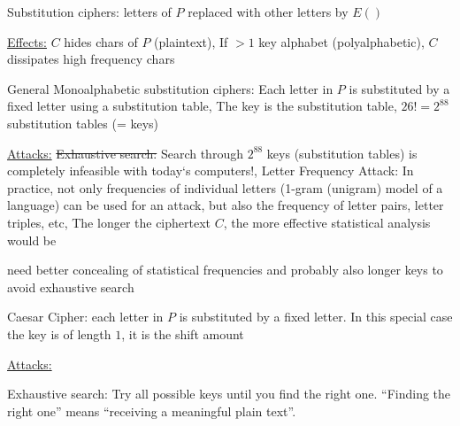 \documentclass[landscape, a4paper]{article}
\begin{document}
\begin{minipage}[t]{0.2\linewidth}
\begin{betterlist}
	\end{betterlist}
	\begin{betterlist}
		\item \alert{Substitution ciphers:} letters of $P$ replaced with other letters by $E()$
		\begin{betterlist}
			\item \underline{Effects:} $C$ hides chars of $P$ (plaintext), If $> 1$ key alphabet (polyalphabetic), $C$ dissipates high frequency chars
		\end{betterlist}
		\begin{betterlist}
			\item \alert{General Monoalphabetic substitution ciphers:} Each letter in $P$ is substituted by a fixed letter using a \alert{substitution table}, The \alert{key} is the substitution table, $26!=2^{88}$ substitution tables (= keys)
			\begin{betterlist}
				\item \underline{Attacks:} \sout{Exhaustive search:} Search through $2^{88}$ keys (substitution tables) is completely infeasible with today‘s computers!, \alert{Letter Frequency Attack:} In practice, not only frequencies of individual letters (\alert{1-gram} (unigram) model of a language) can be used for an attack, but also the frequency of letter pairs, letter triples, etc, The longer the ciphertext $C$, the more effective statistical analysis would be
				\item need better concealing of statistical frequencies and probably also longer keys to avoid exhaustive search
			\end{betterlist}
			\begin{betterlist}
				\item \alert{Caesar Cipher:} each letter in $P$ is substituted by a fixed letter. In this special case the \alert{key} is of length $1$, it is the shift amount
				\begin{betterlist}
					\item \underline{Attacks:}
					\begin{betterlist}
						\item \alert{Exhaustive search:} Try all possible keys until you find the right one. \enquote{Finding the right one} means \enquote{receiving a meaningful plain text}.
						\begin{betterlist}

\end{betterlist}
\end{betterlist}
\end{betterlist}
\end{betterlist}
\end{betterlist}
\end{betterlist}
\end{minipage}
\end{document}
